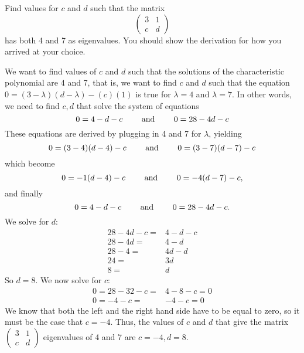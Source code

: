 \documentclass[12pt]{article}
\newenvironment{problem}[2][Problem]
{
	\begin{trivlist} 
		\item[\hskip \labelsep {\bfseries #1 #2:}]
	}
{
	\end{trivlist}
	}
\newenvironment{solution}[1][Solution]
{
	\begin{trivlist} 
		\item[\hskip \labelsep {\itshape #1:}]
	}
	{
	\end{trivlist}
}
\begin{document}
\newpage
\begin{problem}{4}
Find values for $c$ and $d$ such that the matrix
\[
\begin{pmatrix}3&1\\c&d\end{pmatrix}
\]
has both 4 and 7 as eigenvalues. You should show the derivation for how you arrived at your choice.
\noindent
\newline
\newline
\begin{solution}
We want to find values of $c$ and $d$ such that the solutions of the characteristic polynomial are 4 and 7, that is, we want to find $c$ and $d$ such that the equation $0=(3-\lambda)(d-\lambda)-(c)(1)$ is true for $\lambda=4$ and $\lambda=7$. In other words, we need to find $c,d$ that solve the system of equations
\[
0=4-d-c \hphantom{1000} \text{ and } \hphantom{1000} 0=28-4d-c
\]
These equations are derived by plugging in 4 and 7 for $\lambda$, yielding
\[
0=(3-4)(d-4)-c \hphantom{1000} \text{ and } \hphantom{1000} 0=(3-7)(d-7)-c
\]
which become
\[
0=-1(d-4)-c \hphantom{1000} \text{ and } \hphantom{1000} 0=-4(d-7)-c \text{,}
\]
and finally
\[
0=4-d-c \hphantom{1000} \text{ and } \hphantom{1000} 0=28-4d-c \text{.}
\]
We solve for $d$:
\begin{align}
28-4d-c=&4-d-c\\
28-4d=&4-d\\
28-4=&4d-d\\
24=&3d\\
8=&d
\end{align}
So $d=8$. We now solve for $c$:
\begin{align}
0=28-32-c=&4-8-c=0\\
0=-4-c=&-4-c=0
\end{align}
We know that both the left and the right hand side have to be equal to zero, so it must be the case that $c=-4$. Thus, the values of $c$ and $d$ that give the matrix $\begin{pmatrix}3&1\\c&d\end{pmatrix}$ eigenvalues of 4 and 7 are $c=-4, d=8$.
\end{solution}
\end{problem}
\end{document}
